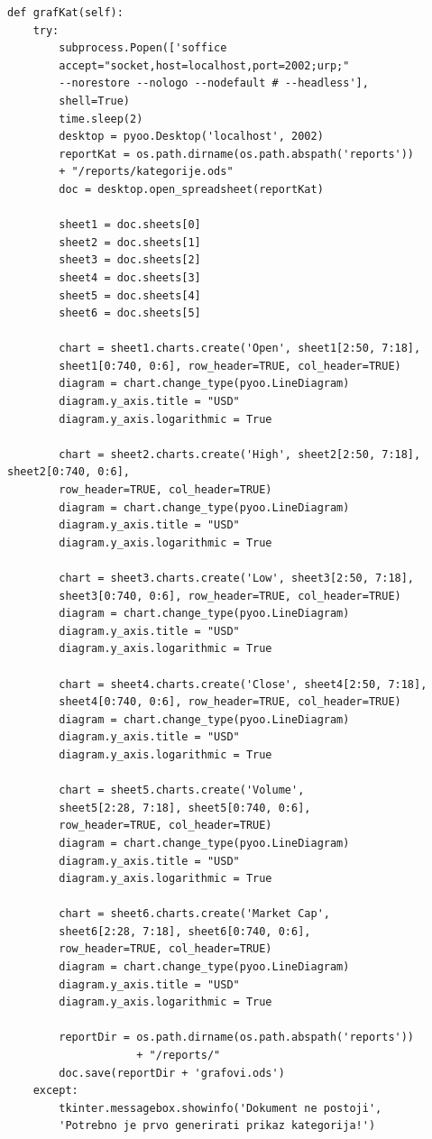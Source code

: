 \documentclass[a4paper,12pt]{foi}
\begin{document}
\lstset{commentstyle=\textit,language=python}
\begin{lstlisting}[frame=tb]
def grafKat(self):
    try:
        subprocess.Popen(['soffice
        accept="socket,host=localhost,port=2002;urp;" 
        --norestore --nologo --nodefault # --headless'],
        shell=True)
        time.sleep(2)
        desktop = pyoo.Desktop('localhost', 2002)
        reportKat = os.path.dirname(os.path.abspath('reports')) 
        + "/reports/kategorije.ods"
        doc = desktop.open_spreadsheet(reportKat)

        sheet1 = doc.sheets[0]
        sheet2 = doc.sheets[1]
        sheet3 = doc.sheets[2]
        sheet4 = doc.sheets[3]
        sheet5 = doc.sheets[4]
        sheet6 = doc.sheets[5]

        chart = sheet1.charts.create('Open', sheet1[2:50, 7:18], 
        sheet1[0:740, 0:6], row_header=TRUE, col_header=TRUE)
        diagram = chart.change_type(pyoo.LineDiagram)
        diagram.y_axis.title = "USD"
        diagram.y_axis.logarithmic = True

        chart = sheet2.charts.create('High', sheet2[2:50, 7:18], sheet2[0:740, 0:6], 
        row_header=TRUE, col_header=TRUE)
        diagram = chart.change_type(pyoo.LineDiagram)
        diagram.y_axis.title = "USD"
        diagram.y_axis.logarithmic = True

        chart = sheet3.charts.create('Low', sheet3[2:50, 7:18], 
        sheet3[0:740, 0:6], row_header=TRUE, col_header=TRUE)
        diagram = chart.change_type(pyoo.LineDiagram)
        diagram.y_axis.title = "USD"
        diagram.y_axis.logarithmic = True

        chart = sheet4.charts.create('Close', sheet4[2:50, 7:18], 
        sheet4[0:740, 0:6], row_header=TRUE, col_header=TRUE)
        diagram = chart.change_type(pyoo.LineDiagram)
        diagram.y_axis.title = "USD"
        diagram.y_axis.logarithmic = True

        chart = sheet5.charts.create('Volume', 
        sheet5[2:28, 7:18], sheet5[0:740, 0:6], 
        row_header=TRUE, col_header=TRUE)
        diagram = chart.change_type(pyoo.LineDiagram)
        diagram.y_axis.title = "USD"
        diagram.y_axis.logarithmic = True

        chart = sheet6.charts.create('Market Cap', 
        sheet6[2:28, 7:18], sheet6[0:740, 0:6], 
        row_header=TRUE, col_header=TRUE)
        diagram = chart.change_type(pyoo.LineDiagram)
        diagram.y_axis.title = "USD"
        diagram.y_axis.logarithmic = True

        reportDir = os.path.dirname(os.path.abspath('reports')) 
        			+ "/reports/"
        doc.save(reportDir + 'grafovi.ods')
    except:
        tkinter.messagebox.showinfo('Dokument ne postoji', 
        'Potrebno je prvo generirati prikaz kategorija!')
\end{lstlisting}
\end{document}
